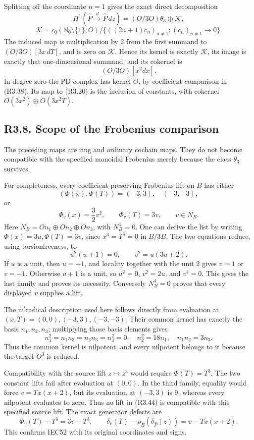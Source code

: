 \documentclass[
  10pt,
]{article}
\begin{document}
Splitting off the coordinate \(n=1\) gives the exact direct
decomposition \[
H^1(\widehat P\xrightarrow d\widehat P\,dz)
=(O/3O)\theta_3\oplus\mathcal K,
\] \[
\mathcal K=
c_0(\mathbb N_0\setminus\{1\},O)\big/
\{((2n+1)c_n)_{n\ne1}:(c_n)_{n\ne1}\to0\}.
\tag{R3.42}
\] The induced map is multiplication by 2 from the first summand to
\((O/3O)[3x\,dT]\), and is zero on \(\mathcal K\). Hence its kernel is
exactly \(\mathcal K\), its image is exactly that one-dimensional
summand, and its cokernel is \[
(O/3O)[x^2dx].
\tag{R3.43}
\] In degree zero the PD complex has kernel \(O\), by coefficient
comparison in (R3.38). Its map to (R3.20) is the inclusion of constants,
with cokernel \(O(3x^2)\oplus O(3x^2T)\).

\subsection{R3.8. Scope of the Frobenius
comparison}\label{r3.8.-scope-of-the-frobenius-comparison}

The preceding maps are ring and ordinary cochain maps. They do not
become compatible with the specified monoidal Frobenius merely because
the class \(\theta_3\) survives.

For completeness, every coefficient-preserving Frobenius lift on \(B\)
has either \[
(\Phi(x),\Phi(T))=(-3,3),\quad(-3,-3),
\] or \[
\Phi_v(x)=\frac32v^2,\qquad \Phi_v(T)=3v,\qquad v\in N_B.
\tag{R3.44}
\] Here \(N_B=On_1\oplus On_2\oplus On_3\), with \(N_B^4=0\). One can
derive the list by writing \(\Phi(x)=3u,\Phi(T)=3v\), since
\(x^3=T^3=0\) in \(B/3B\). The two equations reduce, using
torsionfreeness, to \[
u^2(u+1)=0,\qquad v^2=u(3u+2).
\] If \(u\) is a unit, then \(u=-1\), and locality together with the
unit 2 gives \(v=1\) or \(v=-1\). Otherwise \(u+1\) is a unit, so
\(u^2=0\), \(v^2=2u\), and \(v^4=0\). This gives the last family and
proves its necessity. Conversely \(N_B^4=0\) proves that every displayed
\(v\) supplies a lift.

The nilradical description used here follows directly from evaluation at
\((x,T)=(0,0),(-3,3),(-3,-3)\). Their common kernel has exactly the
basis \(n_1,n_2,n_3\); multiplying those basis elements gives \[
n_1^2=n_1n_3=n_2n_3=n_3^2=0,\quad
n_2^2=18n_1,\quad n_1n_2=3n_3.
\] Thus the common kernel is nilpotent, and every nilpotent belongs to
it because the target \(O^3\) is reduced.

Compatibility with the source lift \(z\mapsto z^3\) would require
\(\Phi(T)=T^3\). The two constant lifts fail after evaluation at
\((0,0)\). In the third family, equality would force \(v=Tx(x+2)\), but
its evaluation at \((-3,3)\) is 9, whereas every nilpotent evaluates to
zero. Thus no lift in (R3.44) is compatible with this specified source
lift. The exact generator defects are \[
\Phi_v(T)-T^3=3v-T^3,\qquad
\delta_v(T)-\rho_B(\delta_{\widehat P}(z))=v-Tx(x+2).
\tag{R3.45}
\] This confirms IEC52 with its original coordinates and signs.
\end{document}
